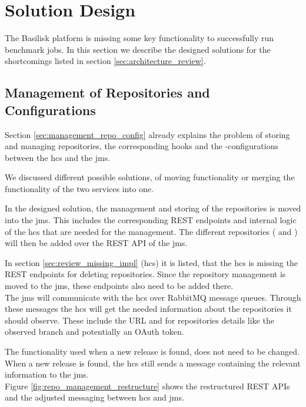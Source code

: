 \section{Solution Design}
\label{sec:solution_design}

The Basilisk platform is missing some key functionality to successfully run benchmark jobs.
In this section we describe the designed solutions for the shortcomings listed in section \ref{sec:architecture_review}.


\subsection{Management of Repositories and Configurations}
\label{sec:management_repo_config_design}
Section \ref{sec:management_repo_config} already explains the problem of storing and managing repositories, the corresponding hooks and the \ts{}-configurations between the \acf{hcs} and the \acf{jms}.

We discussed different possible solutions, of moving functionality or merging the functionality of the two services into one.

In the designed solution, the management and storing of the repositories is moved into the \ac{jms}.
This includes the corresponding REST endpoints and internal logic of the \ac{hcs} that are needed for the management.
The different repositories (\gh{} and \dockh{}) will then be added over the REST API of the \ac{jms}.

In section \ref{sec:review_missing_impl} (\acl{hcs}) it is listed, that the \ac{hcs} is missing the REST endpoints for deleting repositories.
Since the repository management is moved to the \ac{jms}, these endpoints also need to be added there.
\\

The \ac{jms} will communicate with the \ac{hcs} over RabbitMQ message queues.
Through these messages the \ac{hcs} will get the needed information about the repositories it should observe.
These include the URL and for \gh{} repositories details like the observed branch and potentially an OAuth token.

The functionality used when a new release is found, does not need to be changed.
When a new release is found, the \ac{hcs} still sends a message containing the relevant information to the \ac{jms}.
\\

Figure \ref{fig:repo_management_restructure} shows the restructured REST APIs and the adjusted messaging between \ac{hcs} and \ac{jms}.

